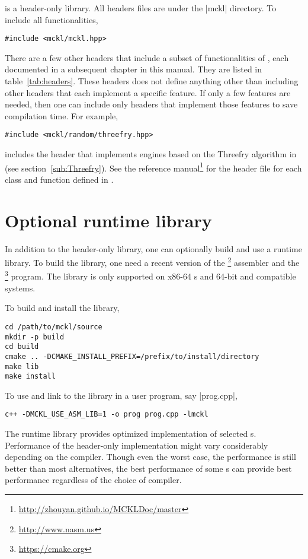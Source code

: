 \mckl is a header-only library. All headers files are under the |mckl|
directory. To include all functionalities,
\begin{verbatim}
#include <mckl/mckl.hpp>
\end{verbatim}
There are a few other headers that include a subset of functionalities of
\mckl, each documented in a subsequent chapter in this manual. They are listed
in table~\ref{tab:headers}. These headers does not define anything other than
including other headers that each implement a specific feature. If only a few
features are needed, then one can include only headers that implement those
features to save compilation time. For example,
\begin{verbatim}
#include <mckl/random/threefry.hpp>
\end{verbatim}
includes the header that implements \rng engines based on the Threefry
algorithm in~\cite{Salmon:2011um} (see section~\ref{sub:Threefry}). See the
reference manual\footnote{\url{http://zhouyan.github.io/MCKLDoc/master}} for
the header file for each class and function defined in \mckl.

\section{Optional runtime library}
\label{sec:Optional runtime library}

In addition to the header-only library, one can optionally build and use a
runtime library. To build the library, one need a recent version of the
\nasm\footnote{\url{http://www.nasm.us}} assembler and the
\cmake\footnote{\url{https://cmake.org}} program. The library is only supported
on x86-64 \cpu{}s and 64-bit \unix and compatible systems.

To build and install the library,
\begin{verbatim}
cd /path/to/mckl/source
mkdir -p build
cd build
cmake .. -DCMAKE_INSTALL_PREFIX=/prefix/to/install/directory
make lib
make install
\end{verbatim}
To use and link to the library in a user program, say |prog.cpp|,
\begin{verbatim}
c++ -DMCKL_USE_ASM_LIB=1 -o prog prog.cpp -lmckl
\end{verbatim}

The runtime library provides optimized implementation of selected \rng{}s.
Performance of the header-only implementation might vary considerably depending
on the compiler. Though even the worst case, the performance is still better
than most alternatives, the best performance of some \rng{}s can provide best
performance regardless of the choice of compiler.

